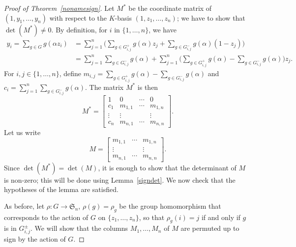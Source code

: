 \documentclass[12pt]{article}
\theoremstyle{plain}
\begin{document}
\begin{proof}[Proof of Theorem~\ref{nonamesign}]
  Let $M^*$ be the coordinate matrix of $(1, y_1, \ldots,
  y_n)$ with respect to the $K$-basis $(1, z_1, \ldots, z_n)$; 
  we  have to show that $\det (M^*) \neq 0$.
  By definition, for $i$ in $\{1,\dots,n\}$, we have
  \begin{align*}
y_i = \sum_{g \in G} g ({\alpha}z_i)&= \sum_{j=1}^n \Big(\sum_{g\in G^{+}_{i,j}}g(\alpha)z_j +\sum_{g\in G^{-}_{i,j}}g(\alpha)(1-z_j)\Big)\\
&=\sum_{j=1}^n\sum_{g\in G^{-}_{i,j}}g(\alpha)+ \sum_{j=1}^n\Big(\sum_{g\in G^{+}_{i,j}}g(\alpha) -\sum_{g\in G^{-}_{i,j}}g(\alpha)\Big)z_j.
  \end{align*}
For $i,j \in \lbrace1, \ldots , n \rbrace$, define $m_{i,j} =
\sum_{g\in G^{+}_{i,j}}g(\alpha) -\sum_{g\in G^{-}_{i,j}}g(\alpha)$
and $c_i = \sum_{j=1}^n\sum_{g\in G^{-}_{i,j}}g(\alpha)$. The matrix
$M^*$ is then
$$M^* = \begin{bmatrix}
1 & 0 & \cdots & 0\\
c_1 & m_{1,1} & \cdots & m_{1,n}\\
\vdots & \vdots &  & \vdots\\
c_{n} & m_{n,1} & \cdots	& m_{n,n}
\end{bmatrix}.
$$
Let us write
$$M = \begin{bmatrix}
 m_{1,1} & \cdots & m_{1,n}\\
 \vdots &  & \vdots\\
 m_{n,1} & \cdots	& m_{n,n}
\end{bmatrix}.$$
Since $\det(M^*) = \det (M)$, it is enough to show that the
determinant of $M$ is non-zero; this will be done using
Lemma~\ref{signdet}. We now check that the hypotheses of the lemma are
satisfied.

As before, let $\rho: G \to \mathfrak{S}_n$, $\rho(g) =
\rho_g$ be the group homomorphism that corresponds to the action of
$G$ on $\lbrace z_1, \ldots , z_n \rbrace$, so that $\rho_g(i) = j$ if
and only if $g$ is in $G^{\pm}_{i,j}$. We will show that the columns
$M_1,\dots,M_n$ of $M$ are permuted up to sign by the action of $G$.


\end{proof}
\end{document}
